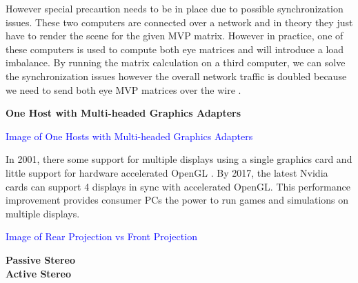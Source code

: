 However special precaution needs to be in place due to possible synchronization issues. These two computers are connected over a network and in theory they just have to render the scene for the given MVP matrix. However in practice, one of these computers is used to compute both eye matrices and will introduce a load imbalance. By running the matrix calculation on a third computer, we can solve the synchronization issues however the overall network traffic is doubled because we need to send both eye MVP matrices over the wire \cite{belleman}.

\filbreak
\noindent\textbf{One Host with Multi-headed Graphics Adapters}\\
\begin{center}
	\textcolor{blue}{Image of One Hosts with Multi-headed Graphics Adapters}
\end{center}

In 2001, there some support for multiple displays using a single graphics card and little support for hardware accelerated OpenGL \cite{belleman}.  By 2017, the latest Nvidia cards can support 4 displays in sync with accelerated OpenGL. This performance improvement provides consumer PCs the power to run games and simulations on multiple displays.


\filbreak
{}
\begin{center}
	\textcolor{blue}{Image of Rear Projection vs Front Projection}
\end{center}


\filbreak
{}

\filbreak
\noindent\textbf{Passive Stereo}\\

\filbreak
\noindent\textbf{Active Stereo}\\

\filbreak
{}

\clearpage
